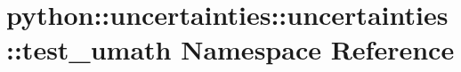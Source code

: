 \hypertarget{namespacepython_1_1uncertainties_1_1uncertainties_1_1test__umath}{
\section{python::uncertainties::uncertainties::test\_\-umath Namespace Reference}
\label{namespacepython_1_1uncertainties_1_1uncertainties_1_1test__umath}
}
